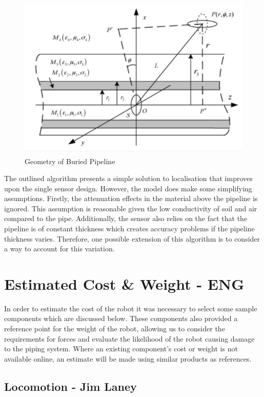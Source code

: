 \documentclass[11pt]{article}		%
\newlength{\imageheight}	 %
\newcommand{\supercite}[1]{\textsuperscript{\cite{#1}}}		%
\begin{document}
			\begin{figure}[h]
				\centering
				\includegraphics[height=\imageheight]{localisation}
				\caption{Geometry of Buried Pipeline\supercite{ELFTransmitter}}
				\label{localisation}
			\end{figure}
			
			The outlined algorithm presents a simple solution to localisation that improves upon the single sensor design. However, the model does make some simplifying assumptions. Firstly, the attenuation effects in the material above the pipeline is ignored. This assumption is reasonable given the low conductivity of soil and air compared to the pipe. Additionally, the sensor also relies on the fact that the pipeline is of constant thickness which creates accuracy problems if the pipeline thickness varies. Therefore, one possible extension of this algorithm is to consider a way to account for this variation. 

	\section{Estimated Cost \& Weight - ENG}
		
		In order to estimate the cost of the robot it was necessary to select some sample components which are discussed below.
		These components also provided a reference point for the weight of the robot, allowing us to consider the requirements for forces and evaluate the likelihood of the robot causing damage to the piping system.
		Where an existing component’s cost or weight is not available online, an estimate will be made using similar products as references. 
		
		\subsection[Locomotion]{Locomotion - Jim Laney}
		
\end{document}
